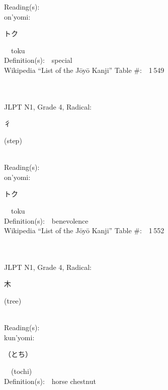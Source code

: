 \begin{multicols}{2}
Reading(s):\ \ \\
{\hspace*{1em}}on'yomi:\ \ \\
{\hspace*{2em}}{\begin{CJK}{UTF8}{min} トク \end{CJK}}\ \ toku\ \ \\
Definition(s):\ \ special \\
Wikipedia ``List of the J\=oy\=o Kanji'' Table \#:\ \ 1\,549 \\
\ \ \\
{\fontsize{34pt}{40pt}  }\ \ \\  %
{JLPT N1, Grade 4, Radical:\ \ {\begin{CJK}{UTF8}{min} 彳 \end{CJK}} (step) } \\
Reading(s):\ \ \\
{\hspace*{1em}}on'yomi:\ \ \\
{\hspace*{2em}}{\begin{CJK}{UTF8}{min} トク \end{CJK}}\ \ toku\ \ \\
Definition(s):\ \ benevolence \\
Wikipedia ``List of the J\=oy\=o Kanji'' Table \#:\ \ 1\,552 \\
\ \ \\
{\fontsize{34pt}{40pt}  }\ \ \\  %
{JLPT N1, Grade 4, Radical:\ \ {\begin{CJK}{UTF8}{min} 木 \end{CJK}} (tree) } \\
Reading(s):\ \ \\
{\hspace*{1em}}kun'yomi:\ \ \\
{\hspace*{2em}}{\begin{CJK}{UTF8}{min} （とち） \end{CJK}}\ \ (tochi)\ \ \\
Definition(s):\ \ horse chestnut \\

\end{multicols}
